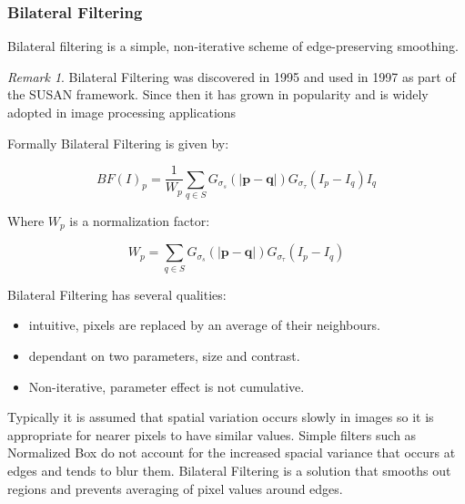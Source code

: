 \documentclass{article}
\theoremstyle{definition}
\theoremstyle{remark}
\newtheorem*{rem}{Remark}
\begin{document}
\subsubsection{Bilateral Filtering}

Bilateral filtering is a simple, non-iterative scheme of edge-preserving smoothing.

\begin{rem}
    Bilateral Filtering was discovered in 1995 and used in 1997 as part of the SUSAN framework. Since then it has grown in popularity and is widely adopted in image processing applications \cite{bilateral_filtering}
\end{rem}

\hfill

\noindent Formally Bilateral Filtering is given by:

\begin{equation}
    BF(I)_p = \frac{1}{W_p}\sum_{q \in S}G_{\sigma_s}(|\pmb{p} - \pmb{q}|) G_{\sigma_\tau}(I_p - I_q)I_q
\end{equation}

\noindent Where $ W_p $ is a normalization factor:

\begin{equation}
    W_p = \sum_{q \in S}G_{\sigma_s}(|\pmb{p} - \pmb{q}|) G_{\sigma_\tau}(I_p - I_q)
\end{equation}

\hfill

\noindent Bilateral Filtering has several qualities:
\begin{itemize}
    \item intuitive, pixels are replaced by an average of their neighbours.

    \item dependant on two parameters, size and contrast.
    
    \item Non-iterative, parameter effect is not cumulative.
\end{itemize}

Typically it is assumed that spatial variation occurs slowly in images so it is appropriate for nearer pixels to have similar values. Simple filters such as Normalized Box do not account for the increased spacial variance that occurs at edges and tends to blur them. Bilateral Filtering is a solution that smooths out regions and prevents averaging of pixel values around edges.\\
\end{document}
